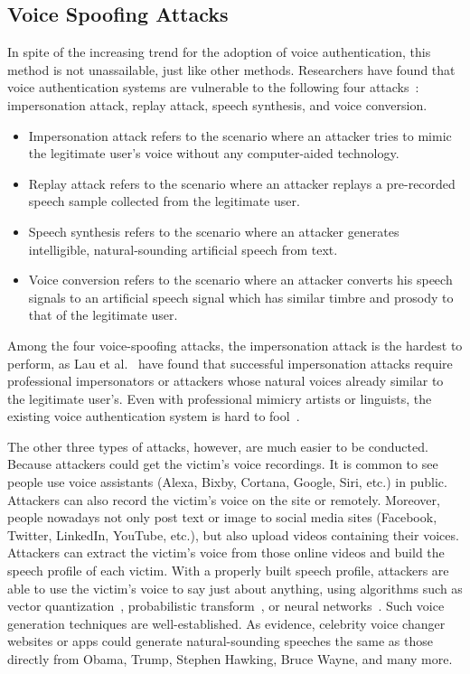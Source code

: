  

\subsection{Voice Spoofing Attacks}\label{sec:spoof}
In spite of the increasing trend for the adoption of voice authentication, this method is not unassailable, just like other methods. Researchers have found that voice authentication systems are vulnerable to the following four attacks~\cite{wu2015spoofing}: impersonation attack, replay attack, speech synthesis, and voice conversion.
\begin{itemize}
	\item Impersonation attack refers to the scenario where an attacker tries to mimic the legitimate user’s voice without any computer-aided technology.
	\item Replay attack refers to the scenario where an attacker replays a pre-recorded speech sample collected from the legitimate user. 
	\item Speech synthesis refers to the scenario where an attacker generates intelligible, natural-sounding artificial speech from text.
	\item Voice conversion refers to the scenario where an attacker converts his speech signals to an artificial speech signal which has similar timbre and prosody to that of the legitimate user.
\end{itemize}


Among the four voice-spoofing attacks, the impersonation attack is the hardest to perform, as Lau et al.~\cite{lau2005testing} have found that successful impersonation attacks require professional impersonators or attackers whose natural voices already similar to the legitimate user's. Even with professional mimicry artists or linguists, the existing voice authentication system is hard to fool~\cite{mariethoz2005can}.


The other three types of attacks, however, are much easier to be conducted. Because attackers could get the victim's voice recordings. It is common to see people use voice assistants (Alexa, Bixby, Cortana, Google, Siri, etc.) in public. Attackers can also record the victim's voice on the site or remotely. Moreover, people nowadays not only post text or image to social media sites (Facebook, Twitter, LinkedIn, YouTube, etc.), but also upload videos containing their voices. Attackers can extract the victim's voice from those online videos and build the speech profile of each victim. With a properly built speech profile, attackers are able to use the victim's voice to say just about anything, using algorithms such as vector quantization~\cite{abe1990voice}, probabilistic transform~\cite{stylianou1998continuous}, or neural networks~\cite{desai2009voice}. Such voice generation techniques are well-established. As evidence, celebrity voice changer websites or apps could generate natural-sounding speeches the same as those directly from Obama, Trump, Stephen Hawking, Bruce Wayne, and many more.




